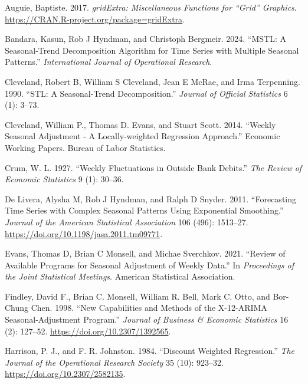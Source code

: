 \hypertarget{refs}{}
\begin{CSLReferences}{1}{0}
\leavevmode{}%
Auguie, Baptiste. 2017. \emph{{gridExtra}: Miscellaneous Functions for {``{Grid}''} Graphics}. \url{https://CRAN.R-project.org/package=gridExtra}.

\leavevmode{}%
Bandara, Kasun, Rob J Hyndman, and Christoph Bergmeir. 2024. {``{MSTL}: A Seasonal-Trend Decomposition Algorithm for Time Series with Multiple Seasonal Patterns.''} \emph{International Journal of Operational Research}.

\leavevmode{}%
Cleveland, Robert B, William S Cleveland, Jean E McRae, and Irma Terpenning. 1990. {``{STL}: A Seasonal-Trend Decomposition.''} \emph{Journal of Official Statistics} 6 (1): 3--73.

\leavevmode{}%
Cleveland, William P., Thomas D. Evans, and Stuart Scott. 2014. {``{Weekly Seasonal Adjustment - A Locally-weighted Regression Approach}.''} Economic Working Papers. Bureau of Labor Statistics.

\leavevmode{}%
Crum, W. L. 1927. {``Weekly Fluctuations in Outside Bank Debits.''} \emph{The Review of Economic Statistics} 9 (1): 30--36.

\leavevmode{}%
De Livera, Alysha M, Rob J Hyndman, and Ralph D Snyder. 2011. {``Forecasting Time Series with Complex Seasonal Patterns Using Exponential Smoothing.''} \emph{Journal of the American Statistical Association} 106 (496): 1513--27. \url{https://doi.org/10.1198/jasa.2011.tm09771}.

\leavevmode{}%
Evans, Thomas D, Brian C Monsell, and Michae Sverchkov. 2021. {``{R}eview of {A}vailable {P}rograms for {S}easonal {A}djustment of {W}eekly {D}ata.''} In \emph{{P}roceedings of the {J}oint {S}tatistical {M}eetings}. American Statistical Association.

\leavevmode{}%
Findley, David F., Brian C. Monsell, William R. Bell, Mark C. Otto, and Bor-Chung Chen. 1998. {``New Capabilities and Methods of the {X}-12-ARIMA Seasonal-Adjustment Program.''} \emph{Journal of Business \& Economic Statistics} 16 (2): 127--52. \url{https://doi.org/10.2307/1392565}.

\leavevmode{}%
Harrison, P. J., and F. R. Johnston. 1984. {``Discount Weighted Regression.''} \emph{The Journal of the Operational Research Society} 35 (10): 923--32. \url{https://doi.org/10.2307/2582135}.


\end{CSLReferences}
